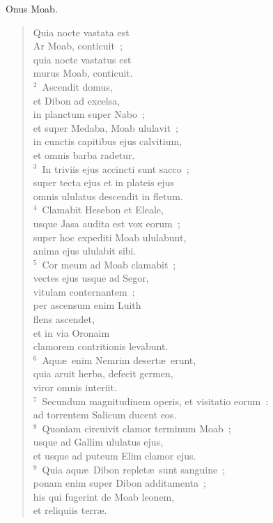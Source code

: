 \lettrine[lines=3,image=true,loversize=0.05,lraise=-0.03]{O}{}nus Moab. \begin{flushleft}\begin{verse}\vspace{6pt}Quia nocte vastata est\\ Ar Moab, conticuit~;\\ quia nocte vastatus est\\ murus Moab, conticuit.\\
${}^{2}$~Ascendit domus,\\ et Dibon ad excelsa,\\ in planctum super Nabo~;\\ et super Medaba, Moab ululavit~;\\ in cunctis capitibus ejus calvitium,\\ et omnis barba radetur.\\
${}^{3}$~In triviis ejus accincti sunt sacco~;\\ super tecta ejus et in plateis ejus\\ omnis ululatus descendit in fletum.\\
${}^{4}$~Clamabit Hesebon et Eleale,\\ usque Jasa audita est vox eorum~;\\ super hoc expediti Moab ululabunt,\\ anima ejus ululabit sibi.\\
${}^{5}$~Cor meum ad Moab clamabit~;\\ vectes ejus usque ad Segor,\\ vitulam conternantem~;\\ per ascensum enim Luith\\ flens ascendet,\\ et in via Oronaim\\ clamorem contritionis levabunt.\\
${}^{6}$~Aqu\ae\ enim Nemrim desert\ae\ erunt,\\ quia aruit herba, defecit germen,\\ viror omnis interiit.\\
${}^{7}$~Secundum magnitudinem operis, et visitatio eorum~:\\ ad torrentem Salicum ducent eos.\\
${}^{8}$~Quoniam circuivit clamor terminum Moab~;\\ usque ad Gallim ululatus ejus,\\ et usque ad puteum Elim clamor ejus.\\
${}^{9}$~Quia aqu\ae\ Dibon replet\ae\ sunt sanguine~;\\ ponam enim super Dibon additamenta~;\\ his qui fugerint de Moab leonem,\\ et reliquiis terr\ae .\end{verse}\end{flushleft}


